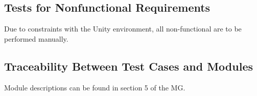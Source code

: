 \documentclass[12pt, titlepage]{article}
\begin{document}
\subsection{Tests for Nonfunctional Requirements}
Due to constraints with the Unity environment, all non-functional are to be performed manually. 


		


					
					
					
					
					

					
					
					
					




\subsection{Traceability Between Test Cases and Modules}
Module descriptions can be found in section 5 of the MG.
\end{document}
